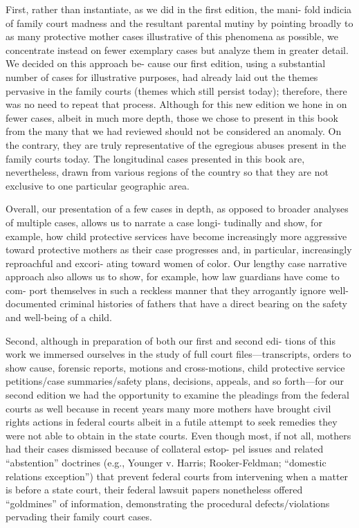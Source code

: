 First, rather than instantiate, as we did in the first edition, the mani-
fold indicia of family court madness and the resultant parental mutiny
by pointing broadly to as many protective mother cases illustrative of
this phenomena as possible, we concentrate instead on fewer exemplary
cases but analyze them in greater detail. We decided on this approach be-
cause our first edition, using a substantial number of cases for illustrative
purposes, had already laid out the themes pervasive in the family courts
(themes which still persist today); therefore, there was no need to repeat
that process. Although for this new edition we hone in on fewer cases,
albeit in much more depth, those we chose to present in this book from
the many that we had reviewed should not be considered an anomaly.
On the contrary, they are truly representative of the egregious abuses
present in the family courts today. The longitudinal cases presented in
this book are, nevertheless, drawn from various regions of the country
so that they are not exclusive to one particular geographic area. \pfl{}


Overall, our presentation of a few cases in depth, as opposed to
broader analyses of multiple cases, allows us to narrate a case longi-
tudinally and show, for example, how child protective services have
become increasingly more aggressive toward protective mothers as their
case progresses and, in particular, increasingly reproachful and excori-
ating toward women of color. Our lengthy case narrative approach also
allows us to show, for example, how law guardians have come to com-
port themselves in such a reckless manner that they arrogantly ignore
well-documented criminal histories of fathers that have a direct bearing
on the safety and well-being of a child. \pfl{}


Second, although in preparation of both our first and second edi-
tions of this work we immersed ourselves in the study of full court
files—transcripts, orders to show cause, forensic reports, motions and
cross-motions, child protective service petitions/case summaries/safety
plans, decisions, appeals, and so forth—for our second edition we had
the opportunity to examine the pleadings from the federal courts as
well because in recent years many more mothers have brought civil
rights actions in federal courts albeit in a futile attempt to seek remedies
they were not able to obtain in the state courts. Even though most, if
not all, mothers had their cases dismissed because of collateral estop-
pel issues and related “abstention” doctrines (e.g., Younger v. Harris;
Rooker-Feldman; “domestic relations exception”) that prevent federal
courts from intervening when a matter is before a state court, their
federal lawsuit papers nonetheless offered “goldmines” of information,
demonstrating the procedural defects/violations pervading their family
court cases. \pfl{}


